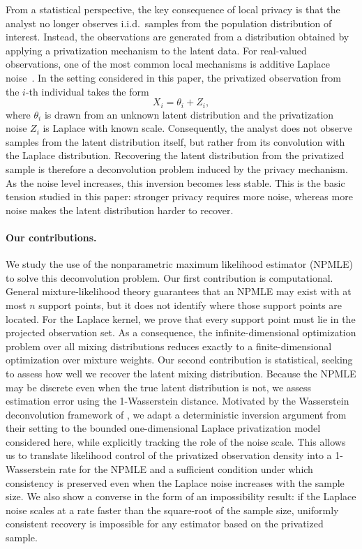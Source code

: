 \documentclass[english, 11pt]{article}
\theoremstyle{plain}
\theoremstyle{definition}
\theoremstyle{remark}
\begin{document}
From a statistical perspective, the key consequence of local privacy is that the analyst no longer observes i.i.d.\ samples from the population distribution of interest.
Instead, the observations are generated from a distribution obtained by applying a privatization mechanism to the latent data.
For real-valued observations, one of the most common local mechanisms is additive Laplace noise~\citep{dwork2006differential}. In the setting considered in this paper, the privatized observation from the $i$-th individual takes the form
\begin{equation*}
X_i=\theta_i+Z_i,
\end{equation*}
where $\theta_i$ is drawn from an unknown latent distribution and the privatization noise $Z_i$ is Laplace with known scale.
Consequently, the analyst does not observe samples from the latent distribution itself, but rather from its convolution with the Laplace distribution. Recovering the latent distribution from the privatized sample is therefore a deconvolution problem induced by the privacy mechanism.
As the noise level increases, this inversion becomes less stable. This is the basic tension studied in this paper: stronger privacy requires more noise, whereas more noise makes the latent distribution harder to recover.

\paragraph{Our contributions.} We study the use of the nonparametric maximum likelihood estimator (NPMLE) to solve this deconvolution problem. 
Our first contribution is computational. General mixture-likelihood theory guarantees that an NPMLE may exist with at most $n$ support points, but it does not identify where those support points are located. 
For the Laplace kernel, we prove that every support point must lie in the projected observation set. 
As a consequence, the infinite-dimensional optimization problem over all mixing distributions reduces exactly to a finite-dimensional optimization over mixture weights.
Our second contribution is statistical, seeking to assess how well we recover the latent mixing distribution. 
Because the NPMLE may be discrete even when the true latent distribution is not, we assess estimation error using the 1-Wasserstein distance.
Motivated by the Wasserstein deconvolution framework of \cite{rousseau2024wasserstein}, we adapt a deterministic inversion argument from their setting to the bounded one-dimensional Laplace privatization model considered here, while explicitly tracking the role of the noise scale.
This allows us to translate likelihood control of the privatized observation density into a 1-Wasserstein rate for the NPMLE and a sufficient condition under which consistency is preserved even when the Laplace noise increases with the sample size.
We also show a converse in the form of an impossibility result: 
if the Laplace noise scales at a rate faster than the square-root of the sample size, uniformly consistent recovery is impossible for any estimator based on the privatized sample.
\end{document}
